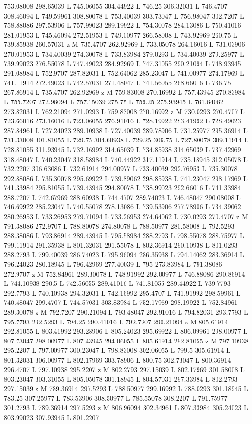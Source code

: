 {\begin{scope}[local bounding box=bb]
{753.08008 298.65039 L 745.06055 304.44922 L 746.25 306.32031 L 746.4707 308.46094 L 749.59961 308.80078 L 753.40039 303.73047 L 756.98047 302.7207 L 758.88086 297.53906 L 757.99023 289.19922 L 754.30078 284.13086 L 750.41016 281.01953 L 745.46094 272.51953 L 749.00977 266.58008 L 743.92969 260.75 L 739.85938 260.57031 z M 735.4707 262.92969 L 733.05078 264.16016 L 731.03906 270.01953 L 734.40039 274.30078 L 733.83984 279.0293 L 734.40039 279.25977 L 739.99023 276.55078 L 747.49023 284.92969 L 747.31055 290.21094 L 748.93945 291.08984 L 752.9707 287.82031 L 752.64062 285.23047 L 741.00977 274.17969 L 741.11914 272.49023 L 742.57031 271.48047 L 741.56055 268.66016 L 736.75 267.86914 L 735.4707 262.92969 z M 759.83008 270.16992 L 757.43945 270.83984 L 755.7207 272.96094 L 757.15039 275.75 L 759.25 275.93945 L 761.64062 273.82031 L 762.21094 271.0293 L 759.83008 270.16992 z M 730.0293 270.4707 L 723.66016 273.16016 L 723.06055 276.91016 L 728.19922 283.41992 L 728.49023 287.84961 L 727.24023 289.10938 L 727.40039 289.78906 L 731.25977 295.36914 L 731.33008 301.81055 L 729.75 304.60938 L 729.25 306.75 L 727.80078 309.11914 L 728.81055 311.93945 L 732.16992 314.65039 L 734.85938 314.65039 L 737.42969 318.48047 L 740.23047 318.58984 L 740.44922 317.11914 L 735.18945 312.05078 L 732.2207 306.63086 L 732.61914 294.00977 L 733.40039 292.76953 L 735.30078 292.88086 L 735.30078 295.69922 L 739.89062 298.85938 L 741.23047 298.17969 L 741.33984 295.81055 L 739.43945 294.80078 L 738.99023 292.66016 L 741.33984 288.7207 L 742.67969 288.60938 L 744.4707 289.74023 L 746.48047 290.08008 L 746.69922 285.23047 L 740.55078 278.13086 L 739.53906 277.78906 L 734.39062 280.26953 L 733.26953 279.71094 L 733.26953 274.64062 L 730.0293 270.4707 z M 791.38086 272.9707 L 788.80078 274.80078 L 788.50977 280.58008 L 792.5293 288.38086 L 793.86914 289.43945 L 795.58984 288.2793 L 798.55078 288.75977 L 799.11914 291.35938 L 801.32031 291.55078 L 802.36914 290.10938 L 801.0293 288.2793 L 799.40039 286.74023 L 795.96094 286.35938 L 794.14062 283.36914 L 796.24023 280.18945 L 796.42969 277.40039 L 795 273.83984 L 791.38086 272.9707 z M 752.84961 289.30078 L 748.91992 292.00977 L 746.88086 290.86914 L 744.10938 290.5 L 742.56055 289.41016 L 741.81055 289.44922 L 739.7793 292.7793 L 740.10938 294.32031 L 742.16992 295.4707 L 741.91992 298.59961 L 740.48047 299.4707 L 744.57031 303.83984 L 752.17969 298.19922 L 752.84961 289.30078 z M 792.7207 290.21094 L 793.48047 292.91016 L 794.82031 293.7793 L 795.7793 292.5293 L 794.25 290.41016 L 792.7207 290.21094 z M 805.61914 292.81055 L 803.41992 293.28906 L 805.24023 295.69922 L 806.09961 298.00977 L 807.73047 298.00977 L 807.43945 294.06055 L 805.61914 292.81055 z M 797.10938 295.2207 L 797.00977 300.23047 L 798.83008 302.06055 L 799.5 305.61914 L 801.32031 306.00977 L 802.17969 303.78906 L 800.75 302.73047 L 800.36914 296.4707 L 797.10938 295.2207 z M 802.2793 297.15039 L 802.17969 301.58008 L 803.23047 303.31055 L 805.05078 301.18945 L 804.57031 297.33984 L 802.2793 297.15039 z M 789.36914 297.5293 L 788.50977 299.16992 L 788.0293 301.18945 L 783.25 307.25977 L 783.53906 308.50977 L 785.55078 308.2207 L 791.75977 301.2793 L 789.36914 297.5293 z M 806.96094 302.34961 L 807.33984 305.24023 L 803.99023 307.93945 L 801.2207 }
\end{scope}}
